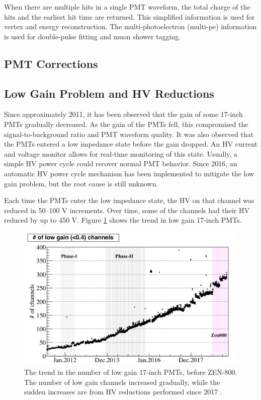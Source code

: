 When there are multiple hits in a single PMT waveform, the total charge of the hits and the earliest hit time are returned. This simplified information is used for vertex and energy reconstruction. The multi-photoelectron (multi-pe) information is used for double-pulse fitting and muon shower tagging.

\subsection{PMT Corrections}
\subsection*{Low Gain Problem and HV Reductions}

Since approximately 2011, it has been observed that the gain of some 17-inch PMTs gradually decreased. As the gain of the PMTs fell, this compromised the signal-to-background ratio and PMT waveform quality. It was also observed that the PMTs entered a low impedance state before the gain dropped. An HV current and voltage monitor allows for real-time monitoring of this state. Usually, a simple HV power cycle could recover normal PMT behavior. Since 2016, an automatic HV power cycle mechanism has been implemented to mitigate the low gain problem, but the root cause is still unknown.


Each time the PMTs enter the low impedance state, the HV on that channel was reduced in 50--100 V increments. Over time, some of the channels had their HV reduced by up to 450 V. Figure \ref{fig:lowgain_trend} shows the trend in low gain 17-inch PMTs.

\begin{figure}[htb]
	\centering
	\includegraphics[scale=0.3]{lowgain_trend.png}
	\caption{The trend in the number of low gain 17-inch PMTs, before ZEN-800. The number of low gain channels increased gradually, while the sudden increases are from HV reductions performed since 2017 \cite{ozaki_phd}.}
	\label{fig:lowgain_trend}
\end{figure}

